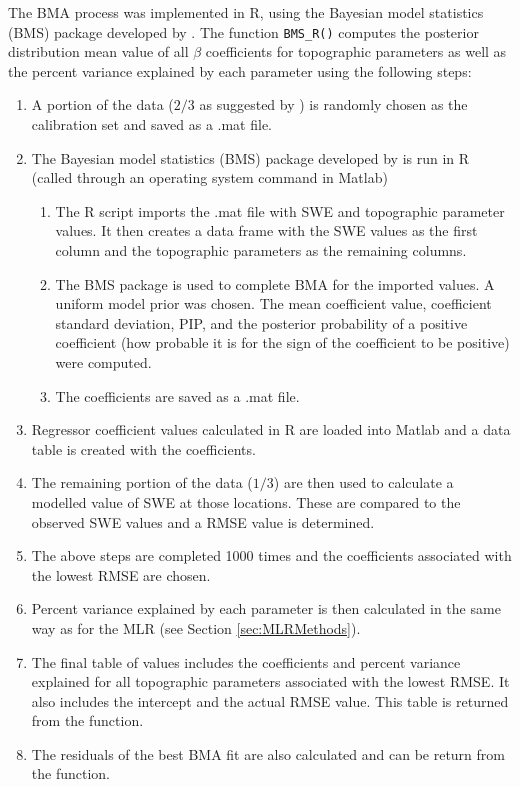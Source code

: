 \documentclass[12pt]{article}
\begin{document}
The BMA process was implemented in R, using the Bayesian model statistics (BMS) package developed by \cite{Zeugner2015}. The function \texttt{BMS\_R()} computes the posterior distribution mean value of all $\beta$ coefficients for topographic parameters as well as the percent variance explained by each parameter using the following steps:
\begin{enumerate}
\item A portion of the data ($2/3$ as suggested by \cite{Kohavi1995}) is randomly chosen as the calibration set and saved as a .mat file. 
\item The Bayesian model statistics (BMS) package developed by \cite{Zeugner2015} is run in R (called through an operating system command in Matlab)
	\begin{enumerate}
		\item The R script imports the .mat file with SWE and topographic parameter values. It then creates a data 				frame with the SWE values as the first column and the topographic parameters as the remaining 					columns. 
		\item The BMS package is used to complete BMA for the imported values. A uniform model prior was chosen. 				The mean coefficient value, coefficient standard deviation, PIP, and the posterior probability of a positive 			coefficient (how probable it is for the sign of the coefficient to be positive) were computed.
		\item The coefficients are saved as a .mat file.
	\end{enumerate}
\item Regressor coefficient values calculated in R are loaded into Matlab and a data table is created with the coefficients.
\item The remaining portion of the data ($1/3$) are then used to calculate a modelled value of SWE at those locations. These are compared to the observed SWE values and a RMSE value is determined.
\item The above steps are completed 1000 times and the coefficients associated with the lowest RMSE are chosen.
\item Percent variance explained by each parameter is then calculated in the same way as for the MLR (see Section \ref{sec:MLRMethods}). 
\item The final table of values includes the coefficients and percent variance explained for all topographic parameters associated with the lowest RMSE. It also includes the intercept and the actual RMSE value. This table is returned from the function.
\item The residuals of the best BMA fit are also calculated and can be return from the function.  
\end{enumerate}
\end{document}
